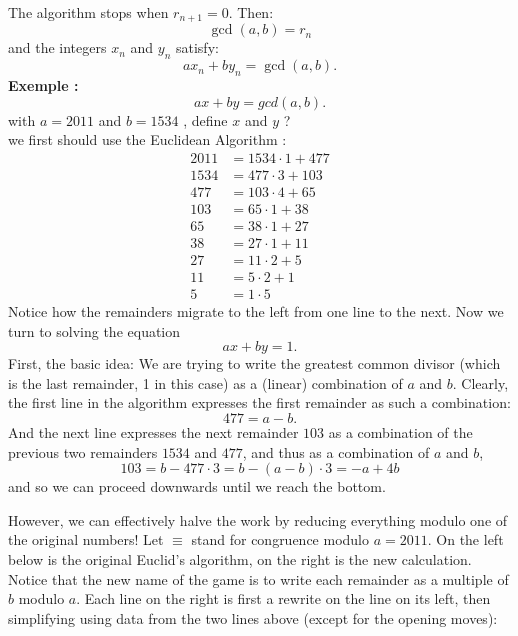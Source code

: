 The algorithm stops when $r_{n+1} = 0$. Then:
\[
\gcd(a,b) = r_n
\]
and the integers $x_n$ and $y_n$ satisfy:
\[
ax_n + by_n = \gcd(a,b).
\]
\textbf{Exemple :}
$$ax +by = gcd(a,b).$$
with $a=2011$ and $b=1534$ , define $x$ and $y$ ?\\
we first should use the  Euclidean Algorithm :
\[
\begin{aligned}
2011 &= 1534 \cdot 1 + 477 \\
1534 &= 477 \cdot 3 + 103 \\
477  &= 103 \cdot 4 + 65 \\
103  &= 65 \cdot 1 + 38 \\
65   &= 38 \cdot 1 + 27 \\
38   &= 27 \cdot 1 + 11 \\
27   &= 11 \cdot 2 + 5 \\
11   &= 5 \cdot 2 + 1 \\
5    &= 1 \cdot 5
\end{aligned}
\]
Notice how the remainders migrate to the left from one line to the next.
Now we turn to solving the equation
\[
ax + by = 1.
\]
First, the basic idea: We are trying to write the greatest common divisor (which is
the last remainder, 1 in this case) as a (linear) combination of $a$ and $b$. Clearly, the
first line in the algorithm expresses the first remainder as such a combination:
\[
477 = a - b.
\]
And the next line expresses the next remainder $103$ as a combination of the previous two remainders $1534$ and $477$, and thus as a combination of $a$ and $b$,
\[
103 = b - 477 \cdot 3 = b - (a - b)\cdot 3 = -a + 4b
\]
and so we can proceed downwards until we reach the bottom.

However, we can effectively halve the work by reducing everything modulo one
of the original numbers! Let $\equiv$ stand for congruence modulo $a = 2011$. On the left
below is the original Euclid’s algorithm, on the right is the new calculation. Notice
that the new name of the game is to write each remainder as a multiple of $b$ modulo $a$.
Each line on the right is first a rewrite on the line on its left, then simplifying
using data from the two lines above (except for the opening moves):

